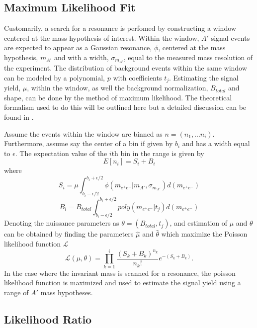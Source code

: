 \subsection{Maximum Likelihood Fit}

Customarily, a search for a resonance is perfomed by constructing a
window centered at the mass hypothesis of interest.  Within the window, $A'$ 
signal events are expected to appear as a Gaussian resonance, $\phi$, centered at
the mass hypothesis, $m_{A'}$ and with a width, $\sigma_{m_{A'}}$, equal to the
 measured mass resolution of
the experiment.  The distribution of background events within the same window
can be modeled by a polynomial, $p$ with coefficients $t_j$.  Estimating the 
signal yield, $\mu$, within
the window, as well the background normalization, $B_{total}$ and shape, can be
done by the method of maximum likelihood.  The theoretical formalism
used to do this will be outlined here but a detailed discussion can be found in
\cite{Cowan:2010js}.

Assume the events within the window are binned as $n = (n_{1}, ... n_{i})$.
Furthermore, assume say the center of a bin if given by $b_i$ and has a width
equal to $\epsilon$. 
The expectation value of the $i$th bin in the range is given by 
\begin{equation}
    E[n_i] = S_{i} + B_{i}
\end{equation}
where 
\begin{equation}
    S_{i} = \mu \int_{b_i - \epsilon/2}^{b_i + \epsilon/2} \phi(m_{e^+e^-} | m_{A'}, \sigma_{m_{A'}}) d (m_{e^+e^-})
\end{equation} 
\begin{equation}
    B_{i} = B_{total} \int_{b_i - \epsilon/2}^{b_i + \epsilon/2} poly(m_{e^+e^-} | t_{j}) d (m_{e^+e^-})
\end{equation}
Denoting the nuissance parameters as $\theta = (B_{total},  t_{j})$, and estimation
of $\mu$ and $\theta$ can be obtained by finding the parameters $\hat{\mu}$ and
$\hat{\theta}$ which maximize the Poisson likelihood function $\mathcal{L}$
\begin{equation}
    \mathcal{L}(\mu, \theta) = \prod_{k=1}^{i} \frac{(S_{k} + B_{k})^{n_k}}{n_{k}!} e^{-(S_{k} + B_{k})}. 
\end{equation}
In the case where the invariant mass is scanned for a resonance, the poisson 
likelihood function is maximized and used to estimate the signal yield using a
range of $A'$ mass hypotheses. 

\subsection{Likelihood Ratio}

